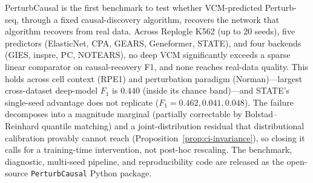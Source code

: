 \documentclass{article}
\theoremstyle{plain}
\theoremstyle{definition}
\theoremstyle{remark}
\begin{document}
PerturbCausal is the first benchmark to test whether VCM-predicted Perturb-seq, through a fixed causal-discovery algorithm, recovers the network that algorithm recovers from real data. Across Replogle K562 (up to 20 seeds), five predictors (ElasticNet, CPA, GEARS, Geneformer, STATE), and four backends (GIES, inspre, PC, NOTEARS), no deep VCM significantly exceeds a sparse linear comparator on causal-recovery F1, and none reaches real-data quality. This holds across cell context (RPE1) and perturbation paradigm (Norman)---largest cross-dataset deep-model $F_1$ is $0.440$ (inside its chance band)---and STATE's single-seed advantage does not replicate ($F_1 = 0.462, 0.041, 0.048$). The failure decomposes into a magnitude marginal (partially correctable by Bolstad--Reinhard quantile matching) and a joint-distribution residual that distributional calibration provably cannot reach (Proposition~\ref{prop:ci-invariance}), so closing it calls for a training-time intervention, not post-hoc rescaling. The benchmark, diagnostic, multi-seed pipeline, and reproducibility code are released as the open-source \texttt{PerturbCausal} Python package.

\end{document}

